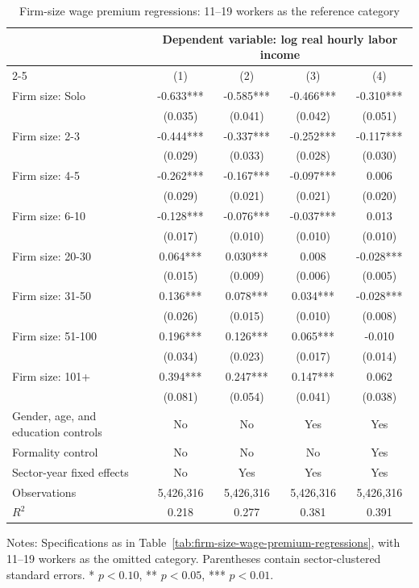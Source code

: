 \begin{table}[htbp]
  \centering
  \caption{Firm-size wage premium regressions: 11--19 workers as the reference category}
  \label{tab:firm-size-wage-premium-regressions-11-19-reference}
  \small
  \begin{tabular}{lcccc}
    \toprule
    & \multicolumn{4}{c}{Dependent variable: log real hourly labor income} \\
    \cmidrule(lr){2-5}
    & (1) & (2) & (3) & (4) \\
    \midrule
    Firm size: Solo & -0.633*** & -0.585*** & -0.466*** & -0.310*** \\
     & (0.035) & (0.041) & (0.042) & (0.051) \\
    Firm size: 2-3 & -0.444*** & -0.337*** & -0.252*** & -0.117*** \\
     & (0.029) & (0.033) & (0.028) & (0.030) \\
    Firm size: 4-5 & -0.262*** & -0.167*** & -0.097*** & 0.006 \\
     & (0.029) & (0.021) & (0.021) & (0.020) \\
    Firm size: 6-10 & -0.128*** & -0.076*** & -0.037*** & 0.013 \\
     & (0.017) & (0.010) & (0.010) & (0.010) \\
    Firm size: 20-30 & 0.064*** & 0.030*** & 0.008 & -0.028*** \\
     & (0.015) & (0.009) & (0.006) & (0.005) \\
    Firm size: 31-50 & 0.136*** & 0.078*** & 0.034*** & -0.028*** \\
     & (0.026) & (0.015) & (0.010) & (0.008) \\
    Firm size: 51-100 & 0.196*** & 0.126*** & 0.065*** & -0.010 \\
     & (0.034) & (0.023) & (0.017) & (0.014) \\
    Firm size: 101+ & 0.394*** & 0.247*** & 0.147*** & 0.062 \\
     & (0.081) & (0.054) & (0.041) & (0.038) \\
    \midrule
    Gender, age, and education controls & No & No & Yes & Yes \\
    Formality control & No & No & No & Yes \\
    Sector-year fixed effects & No & Yes & Yes & Yes \\
    Observations & 5,426,316 & 5,426,316 & 5,426,316 & 5,426,316 \\
    $R^2$ & 0.218 & 0.277 & 0.381 & 0.391 \\
    \bottomrule
  \end{tabular}
  \vspace{0.3em}
  \begin{minipage}{0.95\textwidth}
  \footnotesize
  Notes: Specifications as in Table~\ref{tab:firm-size-wage-premium-regressions}, with 11--19 workers as the omitted category. Parentheses contain sector-clustered standard errors. * $p<0.10$, ** $p<0.05$, *** $p<0.01$.
  \end{minipage}
\end{table}
